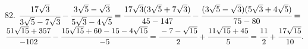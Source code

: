 82. $\cfrac{17\sqrt{3}}{3\sqrt{5}-7\sqrt{3}}-\cfrac{3\sqrt{5}-\sqrt{3}}{5\sqrt{3}-4\sqrt{5}}=
\cfrac{17\sqrt{3}(3\sqrt{5}+7\sqrt{3})}{45-147}-\cfrac{(3\sqrt{5}-\sqrt{3})(5\sqrt{3}+4\sqrt{5})}{75-80}=$\\$
\cfrac{51\sqrt{15}+357}{-102}-\cfrac{15\sqrt{15}+60-15-4\sqrt{15}}{-5}=
\cfrac{-7-\sqrt{15}}{2}+\cfrac{11\sqrt{15}+45}{5}=\cfrac{11}{2}+\cfrac{17\sqrt{15}}{10}.$\\
